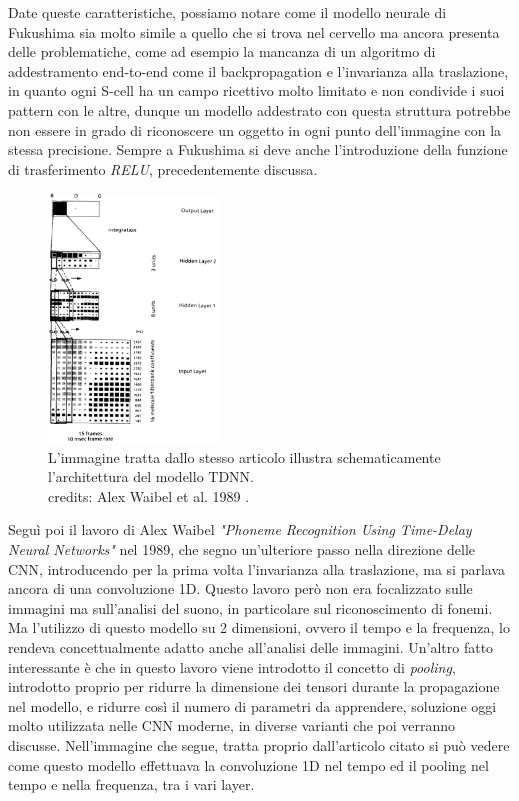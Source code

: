 Date queste caratteristiche, possiamo notare come il modello neurale di Fukushima sia molto simile a quello che si trova nel cervello
ma ancora presenta delle problematiche, come ad esempio la mancanza di un algoritmo di addestramento end-to-end come il backpropagation e 
l'invarianza alla traslazione, in quanto ogni S-cell ha un campo ricettivo molto limitato e non condivide i suoi pattern con le altre,
dunque un modello addestrato con questa struttura potrebbe non essere in grado di riconoscere un oggetto in ogni punto dell'immagine con la stessa precisione.
Sempre a Fukushima si deve anche l'introduzione della funzione di trasferimento \textit{RELU}, precedentemente discussa.

\begin{figure}
    \centering
    \includegraphics[width=0.4\textwidth]{imgs/tdnn_architecture_1.png}
    \caption{L'immagine tratta dallo stesso articolo illustra schematicamente l'architettura del modello TDNN.\\
    credits: Alex Waibel et al. 1989 \cite{Waibel1989PhonemeRecognition}.}
    \label{fig:waibel_network_1}
\end{figure}

Seguì poi il lavoro di Alex Waibel \textit{"Phoneme Recognition Using Time-Delay Neural Networks"} \cite{Waibel1989PhonemeRecognition} 
nel 1989, che segno un'ulteriore passo nella direzione delle CNN, introducendo per la prima volta l'invarianza alla traslazione, 
ma si parlava ancora di una convoluzione 1D. 
Questo lavoro però non era focalizzato sulle immagini ma sull'analisi del suono, in particolare sul riconoscimento di fonemi.
Ma l'utilizzo di questo modello su 2 dimensioni, ovvero il tempo e la frequenza, lo rendeva concettualmente adatto 
anche all'analisi delle immagini. Un'altro fatto interessante è che in questo lavoro viene introdotto il concetto di \textit{pooling},
introdotto proprio per ridurre la dimensione dei tensori durante la propagazione nel modello, e ridurre così il numero di parametri da apprendere,
soluzione oggi molto utilizzata nelle CNN moderne, in diverse varianti che poi verranno discusse.
Nell'immagine che segue, tratta proprio dall'articolo citato si può vedere come questo modello effettuava la convoluzione 1D nel tempo ed il pooling
nel tempo e nella frequenza, tra i vari layer.

